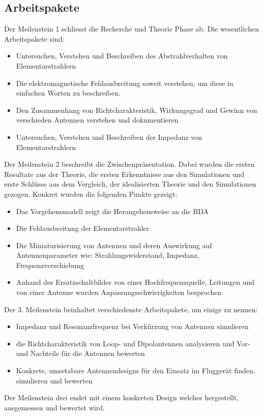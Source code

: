\subsection{Arbeitspakete}
Der Meilenstein 1 schliesst die Recherche und Theorie Phase ab. Die wesentlichen Arbeitspakete sind:
\begin{itemize}
\item Untersuchen, Verstehen und Beschreiben des Abstrahlverhalten von Elementarstrahlern
\item Die elektromagnetische Feldausbreitung soweit  verstehen, um diese in einfachen Worten zu beschreiben.
\item Den Zusammenhang von Richtcharakteristik, Wirkungsgrad und Gewinn von verschieden Antennen verstehen und dokumentieren
\item Untersuchen, Verstehen und Beschreiben der Impedanz von Elementarstrahlern
\end{itemize}
Der Meilenstein 2 beschreibt die Zwischenpräsentation. Dabei wurden die ersten Resultate aus der Theorie,  die ersten Erkenntnisse aus den Simulationen und erste Schlüsse aus dem Vergleich, der idealisierten Theorie und den Simulationen gezogen. 
Konkret wurden die folgenden Punkte gezeigt:
\begin{itemize}
\item Das Vorgehensmodell zeigt die Herangehensweise an die BDA
\item Die Feldausbreitung der Elementarstrahler
\item Die Miniaturisierung von Antennen und deren Auswirkung auf Antennenparameter wie: Strahlungswiderstand, Impedanz, Frequenzverschiebung
\item Anhand des Ersatzschaltbildes von einer Hochfrequenzquelle, Leitungen und von einer Antenne wurden Anpassungsschwierigkeiten besprochen
\end{itemize}
Der 3. Meilenstein beinhaltet verschiedenste Arbeitspakete, um einige zu nennen:
\begin{itemize}
\item Impedanz und Resonanzfrequenz  bei Verkürzung von Antennen simulieren
\item die Richtcharakteristik von Loop- und Dipolantennen analysieren und Vor- und Nachteile für die Antennen bewerten
\item Konkrete, umsetzbare Antennendesigns für den Einsatz im Fluggerät finden, simulieren und bewerten
\end{itemize}
Der Meilenstein drei endet mit einem konkreten Design welches hergestellt, ausgemessen und bewertet wird.\\
